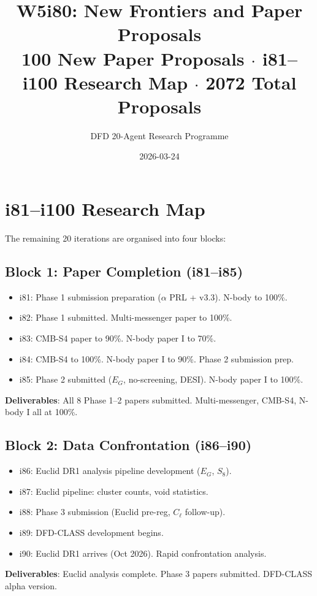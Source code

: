 \documentclass[11pt,a4paper]{article}
\title{W5i80: New Frontiers and Paper Proposals\\[6pt]
\large 100 New Paper Proposals $\cdot$ i81--i100 Research Map $\cdot$ 2072 Total Proposals}
\author{DFD 20-Agent Research Programme}
\date{2026-03-24}
\begin{document}
\maketitle

\section{i81--i100 Research Map}

The remaining 20 iterations are organised into four blocks:

\subsection{Block 1: Paper Completion (i81--i85)}
\begin{itemize}[nosep]
\item i81: Phase 1 submission preparation ($\alpha$ PRL + v3.3). N-body to 100\%.
\item i82: Phase 1 submitted. Multi-messenger paper to 100\%.
\item i83: CMB-S4 paper to 90\%. N-body paper I to 70\%.
\item i84: CMB-S4 to 100\%. N-body paper I to 90\%. Phase 2 submission prep.
\item i85: Phase 2 submitted ($E_G$, no-screening, DESI). N-body paper I to 100\%.
\end{itemize}

\textbf{Deliverables}: All 8 Phase 1--2 papers submitted. Multi-messenger, CMB-S4, N-body I all at 100\%.

\subsection{Block 2: Data Confrontation (i86--i90)}
\begin{itemize}[nosep]
\item i86: Euclid DR1 analysis pipeline development ($E_G$, $S_8$).
\item i87: Euclid pipeline: cluster counts, void statistics.
\item i88: Phase 3 submission (Euclid pre-reg, $C_\ell$ follow-up).
\item i89: DFD-CLASS development begins.
\item i90: Euclid DR1 arrives (Oct 2026). Rapid confrontation analysis.
\end{itemize}

\textbf{Deliverables}: Euclid analysis complete. Phase 3 papers submitted. DFD-CLASS alpha version.
\end{document}
